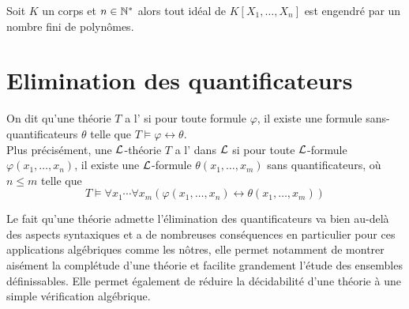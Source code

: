 \begin{theo}\label{theo-base-Hilbert}
Soit $K$ un corps et $n\in \mathbb{N}^{*}$ alors tout idéal de $K[X_1, \ldots, X_n ]$ est
engendré par un nombre fini de polynômes.
\end{theo}

\section{Elimination des quantificateurs}

\begin{defi}\label{def-quant-elim}
On dit qu'une théorie $T$ a l' si pour toute
formule $\varphi$, il existe une formule sans-quantificateurs $\theta$ telle que
$T \models \varphi \leftrightarrow \theta$. \\
Plus précisément, une $\mathcal{L}$-théorie
$T$ a l' dans $\mathcal{L}$ si pour toute
$\mathcal{L}$-formule $\varphi(x_1, \ldots, x_n)$, il existe une $\mathcal{L}$-formule
$\theta(x_1, \ldots, x_m)$ sans quantificateurs, où $n \le m$ telle que \[ T
\models \forall x_1 \cdots \forall x_m ( \varphi(x_1, \ldots, x_n)
\leftrightarrow \theta(x_1, \ldots, x_m)) \] 
\end{defi}


Le fait qu'une théorie admette l'élimination des quantificateurs va bien au-delà
des aspects syntaxiques et a de nombreuses conséquences en particulier pour ces
applications algébriques comme les nôtres, elle permet notamment de montrer
aisément la complétude d'une théorie et facilite grandement l'étude des
ensembles définissables. Elle permet également de réduire la décidabilité d'une
théorie à une simple vérification algébrique. 

